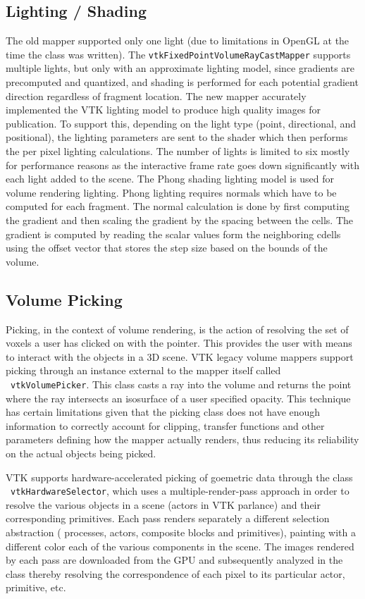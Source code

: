 \subsection{Lighting / Shading}
The old mapper supported only one light (due to limitations in OpenGL at the
time the class was written). The \texttt{vtkFixedPointVolumeRayCastMapper}
supports multiple lights, but only with an approximate lighting model, since
gradients are precomputed and quantized, and shading is performed for each
potential gradient direction regardless of fragment location. The new mapper
accurately implemented the VTK lighting model to produce high quality images for
publication. To support this, depending on the light type (point, directional,
and positional), the lighting parameters are sent to the shader which then
performs the per pixel lighting calculations. The number of lights is limited to
six mostly for performance reasons as the interactive frame rate goes down
significantly with each light added to the scene. The Phong shading lighting
model is used for volume rendering lighting. Phong lighting requires normals
which have to be computed for each fragment. The normal calculation is done by
first computing the gradient and then scaling the gradient by the spacing
between the cells. The gradient is computed by reading the scalar values form
the neighboring cdells using the offset vector that stores the step size based
on the bounds of the volume.

\subsection{Volume Picking}
Picking, in the context of volume rendering, is the action of resolving the set
of voxels a user has clicked on with the pointer. This provides the user with
means to interact with the objects in a 3D scene. VTK legacy volume mappers
support picking through an instance external to the mapper itself called
~\texttt{vtkVolumePicker}.  This class casts a ray into the volume and returns
the point where the ray intersects an isosurface of a user specified opacity.
This technique has certain limitations given that the picking class does not
have enough information to correctly account for clipping, transfer functions
and other parameters defining how the mapper actually renders, thus reducing its
reliability on the actual objects being picked.

VTK supports hardware-accelerated picking of goemetric data through the class
~\texttt{vtkHardwareSelector}, which uses a multiple-render-pass approach in
order to resolve the various objects in a scene (actors in VTK parlance) and
their corresponding primitives.  Each pass renders separately a different
selection abstraction ( processes, actors, composite blocks and primitives),
painting with a different color each of the various components in the scene.
The images rendered by each pass are downloaded from the GPU and subsequently
analyzed in the class thereby resolving the correspondence of each pixel to its
particular actor, primitive, etc.

